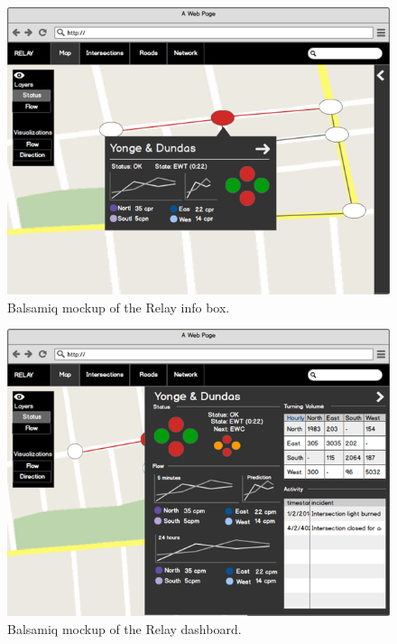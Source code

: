 \documentclass{report}
\begin{document}
\begin{figure}[htbp!]
  \begin{centering}
    \includegraphics[scale=0.6]{figures/bals-2.png}
    \caption{Balsamiq mockup of the Relay info box.}
    \label{fig:bals-2}
  \end{centering}
\end{figure}

\begin{figure}[htbp!]
  \begin{centering}
    \includegraphics[scale=0.6]{figures/bals-3.png}
    \caption{Balsamiq mockup of the Relay dashboard.}
    \label{fig:bals-3}
  \end{centering}
\end{figure}
\end{document}
